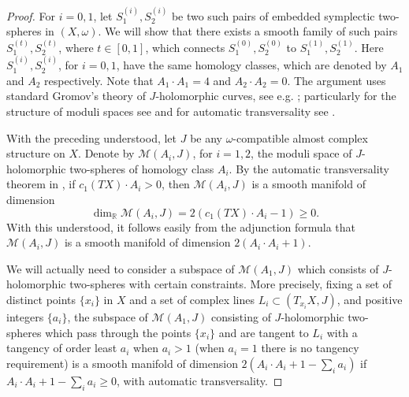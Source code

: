 \documentclass[11pt]{amsart}
\theoremstyle{plain}
\numberwithin{theorem}{section}
\theoremstyle{definition}
\newcommand{\R}{{\mathbb R}}
\newcommand{\M}{{\mathcal M}}
\begin{document}
\begin{proof}
For $i=0,1$, let $S_1^{(i)},S_2^{(i)}$ be two such pairs of embedded symplectic two-spheres in $(X,\omega)$. 
We will show that there exists a smooth family of such pairs $S_1^{(t)},S_2^{(t)}$, where $t\in [0,1]$, which connects 
$S_1^{(0)},S_2^{(0)}$ to $S_1^{(1)},S_2^{(1)}$. Here $S_1^{(i)},S_2^{(i)}$, for $i=0,1$, have the same homology classes, which are denoted by $A_1$ and $A_2$ respectively. Note that $A_1\cdot A_1=4$ and $A_2\cdot A_2=0$.  The argument uses standard Gromov's  theory of $J$-holomorphic curves, see e.g. \cite{Gr, HLS, IvaS, Bar, Shev, ST}; particularly for the structure of moduli spaces see \cite{IvaS} and for automatic transversality see \cite{HLS}. 

With the preceding understood, let $J$ be any $\omega$-compatible almost complex structure on $X$. Denote
by $\M(A_i,J)$, for $i=1,2$, the moduli space of $J$-holomorphic two-spheres of homology class $A_i$. By
the automatic transversality theorem in \cite{HLS}, if $c_1(TX)\cdot A_i>0$, then $\M(A_i,J)$ is a smooth manifold of dimension 
$$
\dim_\R \M(A_i,J)=2(c_1(TX)\cdot A_i-1)\geq 0.
$$
With this understood, it follows easily from the adjunction formula that 
$\M(A_i,J)$ is a smooth manifold of dimension $2(A_i\cdot A_i+1)$. 

We will actually need to consider a subspace of $\M(A_1,J)$ which consists of $J$-holomorphic two-spheres 
with certain constraints. More precisely, fixing a set of distinct points $\{x_i\}$ in $X$ and a set of complex lines 
$L_i\subset (T_{x_i} X,J)$, and positive integers $\{a_i\}$, the subspace of $\M(A_1,J)$ consisting of $J$-holomorphic two-spheres which pass through the points $\{x_i\}$ and are tangent to $L_i$ with a tangency of
order least $a_i$ when $a_i>1$ (when $a_i=1$ there is no tangency requirement) is a smooth manifold of dimension $2(A_i\cdot A_i+1-\sum_i a_i)$ if $A_i\cdot A_i+1-\sum_i a_i\geq 0$, with automatic transversality. 


\end{proof}
\end{document}
